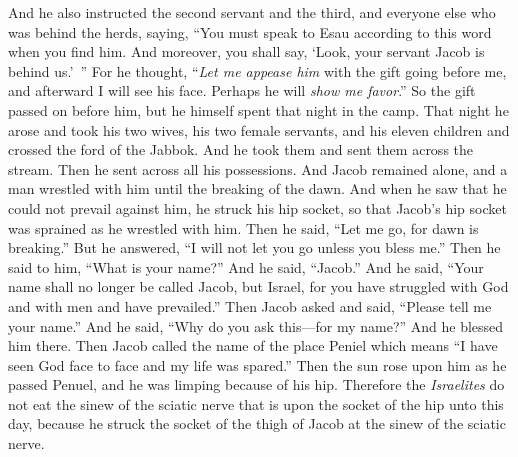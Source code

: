 \begin{biblechapter}
\verse And he also instructed the second servant and the third, and everyone else who was behind the herds, saying, “You must speak to Esau according to this word when you find him.
\verse And moreover, you shall say, ‘Look, your servant Jacob is behind us.’ ” For he thought, “\textit{Let me appease him} with the gift going before me, and afterward I will see his face. Perhaps he will \textit{show me favor}.”
\verse So the gift passed on before him, but he himself spent that night in the camp.
 That night he arose and took his two wives, his two female servants, and his eleven children and crossed the ford of the Jabbok.
\verse And he took them and sent them across the stream. Then he sent across all his possessions.
\verse And Jacob remained alone, and a man wrestled with him until the breaking of the dawn.
\verse And when he saw that he could not prevail against him, he struck his hip socket, so that Jacob’s hip socket was sprained as he wrestled with him.
\verse Then he said, “Let me go, for dawn is breaking.” But he answered, “I will not let you go unless you bless me.”
\verse Then he said to him, “What is your name?” And he said, “Jacob.”
\verse And he said, “Your name shall no longer be called Jacob, but Israel, for you have struggled with God and with men and have prevailed.”
\verse Then Jacob asked and said, “Please tell me your name.” And he said, “Why do you ask this—for my name?” And he blessed him there.
\verse Then Jacob called the name of the place Peniel which means “I have seen God face to face and my life was spared.”
\verse Then the sun rose upon him as he passed Penuel, and he was limping because of his hip.
\verse Therefore the \textit{Israelites} do not eat the sinew of the sciatic nerve that is upon the socket of the hip unto this day, because he struck the socket of the thigh of Jacob at the sinew of the sciatic nerve.
\end{biblechapter}

